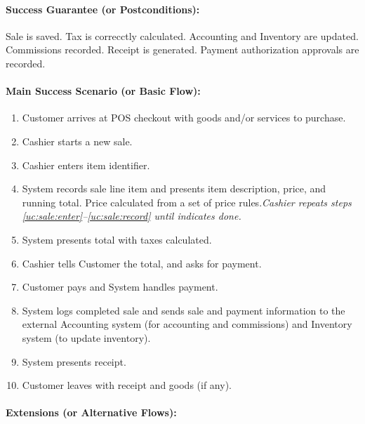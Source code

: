 \documentclass[11pt]{report}
\begin{document}
\paragraph{Success Guarantee (or Postconditions):} Sale is saved.  Tax is
correcctly calculated.  Accounting and Inventory are updated.
Commissions recorded.  Receipt is generated.  Payment authorization
approvals are recorded.

\paragraph{Main Success Scenario (or Basic Flow):}
\begin{enumerate}
\item \label{uc:sale:arrive} Customer arrives at POS checkout with
  goods and/or services to purchase.
\item \label{uc:sale: start} Cashier starts a new sale.
\item \label{uc:sale:enter} Cashier enters item identifier.
\item \label{uc:sale:record} System records sale line item and
  presents item description, price, and running total.  Price
  calculated from a set of price rules.\newline \emph{Cashier repeats
    steps \ref{uc:sale:enter}--\ref{uc:sale:record} until indicates
    done.}
\item \label{uc:sale:total} System presents total with taxes
  calculated.
\item \label{uc:sale:ask} Cashier tells Customer the total, and asks
  for payment.
\item \label{uc:sale:pay} Customer pays and System handles payment.
\item System logs completed sale and sends sale and payment
  information to the external Accounting system (for accounting and
  commissions) and Inventory system (to update inventory).
\item System presents receipt.
\item Customer leaves with receipt and goods (if any).
\end{enumerate}

\paragraph{Extensions (or Alternative Flows):}
\end{document}
